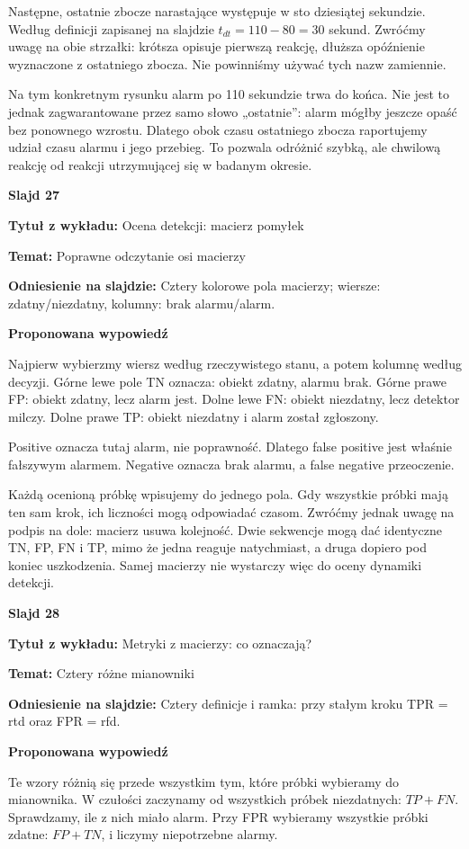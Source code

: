 \documentclass[a4paper,11pt]{article}
\newcommand{\NumerSlajdu}{1}
\newcommand{\Komentarz}[3]{%
  \gdef\NumerSlajdu{#1}%
  {\Large\bfseries Slajd #1\par}\smallskip
  \textbf{Tytuł z wykładu:} #2\par
  \textbf{Temat:} #3\par\medskip
}
\begin{document}
Następne, ostatnie zbocze narastające występuje w sto dziesiątej sekundzie. Według definicji zapisanej na slajdzie $t_{dt}=110-80=30$ sekund. Zwróćmy uwagę na obie strzałki: krótsza opisuje pierwszą reakcję, dłuższa opóźnienie wyznaczone z ostatniego zbocza. Nie powinniśmy używać tych nazw zamiennie.

Na tym konkretnym rysunku alarm po 110 sekundzie trwa do końca. Nie jest to jednak zagwarantowane przez samo słowo „ostatnie”: alarm mógłby jeszcze opaść bez ponownego wzrostu. Dlatego obok czasu ostatniego zbocza raportujemy udział czasu alarmu i jego przebieg. To pozwala odróżnić szybką, ale chwilową reakcję od reakcji utrzymującej się w badanym okresie.
\clearpage

\Komentarz{27}{Ocena detekcji: macierz pomyłek}{Poprawne odczytanie osi macierzy}
{\small\color{black!65}\textbf{Odniesienie na slajdzie:} Cztery kolorowe pola macierzy; wiersze: zdatny/niezdatny, kolumny: brak alarmu/alarm.\par}
\medskip
\textbf{Proponowana wypowiedź}\par
Najpierw wybierzmy wiersz według rzeczywistego stanu, a potem kolumnę według decyzji. Górne lewe pole TN oznacza: obiekt zdatny, alarmu brak. Górne prawe FP: obiekt zdatny, lecz alarm jest. Dolne lewe FN: obiekt niezdatny, lecz detektor milczy. Dolne prawe TP: obiekt niezdatny i alarm został zgłoszony.

Positive oznacza tutaj alarm, nie poprawność. Dlatego false positive jest właśnie fałszywym alarmem. Negative oznacza brak alarmu, a false negative przeoczenie.

Każdą ocenioną próbkę wpisujemy do jednego pola. Gdy wszystkie próbki mają ten sam krok, ich liczności mogą odpowiadać czasom. Zwróćmy jednak uwagę na podpis na dole: macierz usuwa kolejność. Dwie sekwencje mogą dać identyczne TN, FP, FN i TP, mimo że jedna reaguje natychmiast, a druga dopiero pod koniec uszkodzenia. Samej macierzy nie wystarczy więc do oceny dynamiki detekcji.
\clearpage

\Komentarz{28}{Metryki z macierzy: co oznaczają?}{Cztery różne mianowniki}
{\small\color{black!65}\textbf{Odniesienie na slajdzie:} Cztery definicje i ramka: przy stałym kroku TPR = rtd oraz FPR = rfd.\par}
\medskip
\textbf{Proponowana wypowiedź}\par
Te wzory różnią się przede wszystkim tym, które próbki wybieramy do mianownika. W czułości zaczynamy od wszystkich próbek niezdatnych: $TP+FN$. Sprawdzamy, ile z nich miało alarm. Przy FPR wybieramy wszystkie próbki zdatne: $FP+TN$, i liczymy niepotrzebne alarmy.
\end{document}
